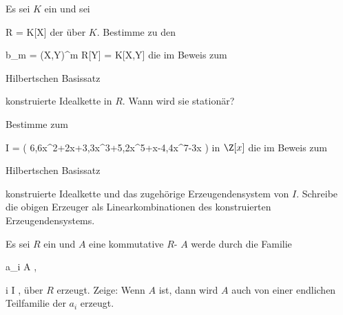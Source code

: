 {}
{




Es sei $K$ ein
 und sei

\mavergleichskette
{\vergleichskette
{ R
}
{ = }{ K[X]
}
{  }{
}
{    }{
}
{   }{
}
}
{}{}{}
der
über $K$. Bestimme zu den

\mavergleichskettedisp
{\vergleichskette
{ {\mathfrak b}_m
}
{ =} { (X,Y)^m
}
{ \subseteq} { R[Y] = K[X,Y]
}
{ } {
}
{ } {
}
}
{}{}{}
die im Beweis zum

Hilbertschen Basissatz

konstruierte Idealkette in $R$. Wann wird sie stationär?




}
{} {}


{}
{




Bestimme zum

\mavergleichskettedisp
{\vergleichskette
{ I
}
{ =} {  \left(  6,6x^2+2x+3,3x^3+5,2x^5+x-4,4x^7-3x  \right)
}
{ } {
}
{ } {
}
{ } {
}
}
{}{}{}
in $\Z[x]$ die im Beweis zum

Hilbertschen Basissatz

konstruierte Idealkette und das zugehörige Erzeugendensystem von $I$. Schreibe die obigen Erzeuger als Linearkombinationen des konstruierten Erzeugendensystems.




}
{} {}


{}
{




Es sei $R$ ein
und $A$ eine kommutative
$R$-
$A$ werde durch die Familie

\mavergleichskette
{\vergleichskette
{ a_i
}
{ \in }{A
}
{  }{
}
{    }{
}
{   }{
}
}
{}{}{,}

\mavergleichskette
{\vergleichskette
{ i
}
{ \in }{ I
}
{  }{
}
{    }{
}
{   }{
}
}
{}{}{,}
über $R$ erzeugt. Zeige: Wenn $A$
ist, dann wird  $A$ auch von einer endlichen Teilfamilie der $a_i$ erzeugt.




}
{} {}


